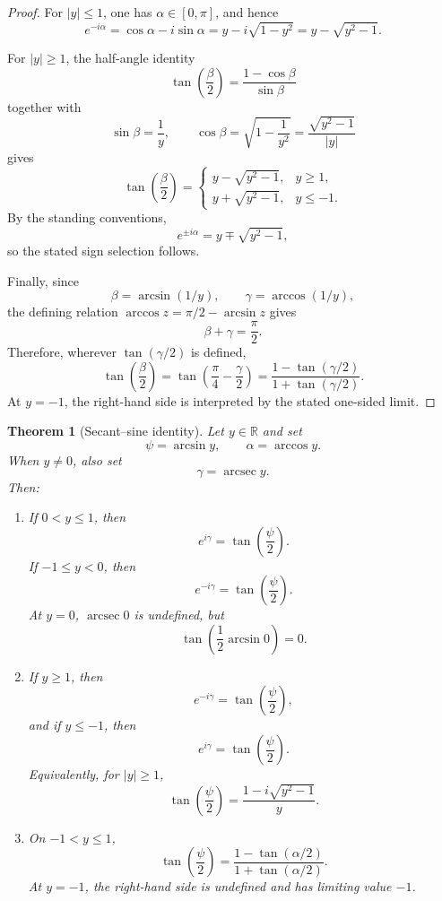 \documentclass[11pt]{article}
\newtheorem{theorem}{Theorem}[section]
\theoremstyle{remark}
\DeclareMathOperator{\arcsec}{arcsec}
\begin{document}
\begin{proof}
For \(|y|\le1\), one has \(\alpha\in[0,\pi]\), and hence
\[
e^{-i\alpha}
=\cos\alpha-i\sin\alpha
=y-i\sqrt{1-y^2}
=y-\sqrt{y^2-1}.
\]

For \(|y|\ge1\), the half-angle identity
\[
\tan\!\left(\frac{\beta}{2}\right)
=\frac{1-\cos\beta}{\sin\beta}
\]
together with
\[
\sin\beta=\frac{1}{y},
\qquad
\cos\beta
=\sqrt{1-\frac{1}{y^2}}
=\frac{\sqrt{y^2-1}}{|y|}
\]
gives
\[
\tan\!\left(\frac{\beta}{2}\right)
=
\begin{cases}
y-\sqrt{y^2-1},
& y\ge1,\\[1mm]
y+\sqrt{y^2-1},
& y\le-1.
\end{cases}
\]
By the standing conventions,
\[
e^{\pm i\alpha}
=y\mp\sqrt{y^2-1},
\]
so the stated sign selection follows.

Finally, since
\[
\beta=\arcsin(1/y),
\qquad
\gamma=\arccos(1/y),
\]
the defining relation \(\arccos z=\pi/2-\arcsin z\) gives
\[
\beta+\gamma=\frac{\pi}{2}.
\]
Therefore, wherever \(\tan(\gamma/2)\) is defined,
\[
\tan\!\left(\frac{\beta}{2}\right)
=\tan\!\left(\frac{\pi}{4}-\frac{\gamma}{2}\right)
=\frac{1-\tan(\gamma/2)}
     {1+\tan(\gamma/2)}.
\]
At \(y=-1\), the right-hand side is interpreted by the stated one-sided limit.
\end{proof}

\begin{theorem}[Secant--sine identity]
\label{thm:sec-sin}
Let \(y\in\mathbb R\) and set
\[
\psi=\arcsin y,
\qquad
\alpha=\arccos y.
\]
When \(y\ne0\), also set
\[
\gamma=\arcsec y.
\]
Then:
\begin{enumerate}[label=\arabic*.]
\item If \(0<y\le1\), then
\[
e^{i\gamma}
=\tan\!\left(\frac{\psi}{2}\right).
\]
If \(-1\le y<0\), then
\[
e^{-i\gamma}
=\tan\!\left(\frac{\psi}{2}\right).
\]
At \(y=0\), \(\arcsec 0\) is undefined, but
\[
\tan\!\left(\frac{1}{2}\arcsin 0\right)=0.
\]

\item If \(y\ge1\), then
\[
e^{-i\gamma}
=\tan\!\left(\frac{\psi}{2}\right),
\]
and if \(y\le-1\), then
\[
e^{i\gamma}
=\tan\!\left(\frac{\psi}{2}\right).
\]
Equivalently, for \(|y|\ge1\),
\[
\tan\!\left(\frac{\psi}{2}\right)
=\frac{1-i\sqrt{y^2-1}}{y}.
\]

\item On \(-1<y\le1\),
\[
\tan\!\left(\frac{\psi}{2}\right)
=
\frac{1-\tan(\alpha/2)}
     {1+\tan(\alpha/2)}.
\]
At \(y=-1\), the right-hand side is undefined and has limiting value
\(-1\).
\end{enumerate}
\end{theorem}
\end{document}
